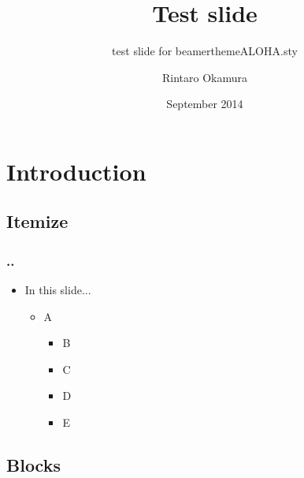 \documentclass[ignorenonframetext,14pt]{beamer}
\title[]{Test slide}
\subtitle{test slide for beamerthemeALOHA.sty}
\author[]{Rintaro Okamura}
\institute[]{\footnotesize Tohoku University}
\date[September 2014]{September 2014}
\begin{document}
\begin{frame}
    \maketitle
    \thispagestyle{empty}
\end{frame}

\section{Introduction}

\subsection{Itemize}

\begin{frame}
    \frametitle{\insertsectionnumber.\insertsubsectionnumber. \insertsubsectionhead}

    \begin{itemize}
        \item[\Large] \large In this slide...
            \begin{itemize}
                \normalsize
                \item A
                \begin{itemize}
                    \normalsize
                    \item \textcolor{ALHPink}{B}
                    \item \textcolor{ALHBlue}{C}
                    \item D
                    \item E
                \end{itemize}
            \end{itemize}
    \end{itemize}
\end{frame}

\subsection{Blocks}
\end{document}
